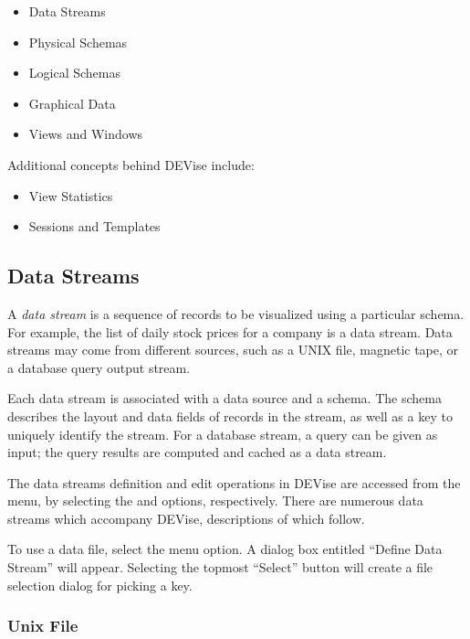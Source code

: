 \begin{itemize}
	\item Data Streams
	\item Physical Schemas
	\item Logical Schemas
	\item Graphical Data
	\item Views and Windows
\end{itemize}

Additional concepts behind DEVise include:

\begin{itemize}
	\item View Statistics
	\item Sessions and Templates
\end{itemize}


\subsection{Data Streams}
\label{sect:data_stream_concepts}

A {\em data stream} is a sequence of records to be visualized using a particular
schema. For example, the list of daily stock prices for a company is a data stream. Data
streams may come from different sources, such as a UNIX file, magnetic tape, or
a database query output stream.

Each data stream is associated with a data source and a schema. The schema
describes the layout and data fields of records in the stream, as well as a key
to uniquely identify the stream. For a database stream, a query can
be given as input; the query results are computed and cached as a
data stream.

The data streams definition and edit operations in DEVise are accessed from the
 menu, by selecting the  and  options,
respectively. There are numerous data streams which accompany DEVise,
descriptions of which follow.

To use a data file, select the  menu option. A dialog box
entitled ``Define Data Stream'' will appear. Selecting the topmost ``Select''
button will create a file selection dialog for picking a key.

\subsubsection{Unix File}

